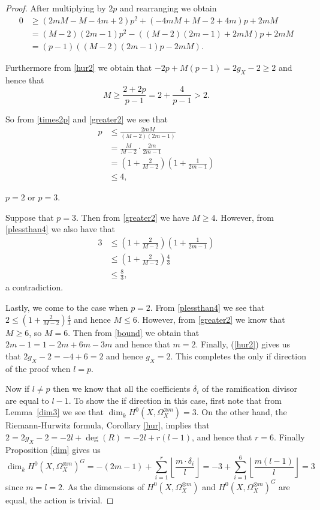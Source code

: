 \begin{proof}
After multiplying by $2p$ and rearranging we obtain
\begin{align}\label{times2p}
0 & \geq  (2mM-M-4m+2)p^2+(-4mM+M-2+4m)p+2mM \nonumber \\
& =  (M-2)(2m-1)p^2-((M-2)(2m-1)+2mM)p+2mM \nonumber \\
& =  (p-1)((M-2)(2m-1)p-2mM).
\end{align}

Furthermore from \eqref{hur2} we obtain that $-2p+M(p-1)=2g_X-2 \geq 2$ and hence that 
\begin{equation}\label{greater2}
M\geq \frac{2+2p}{p-1}=2+\frac{4}{p-1}>2.
\end{equation}

So from \eqref{times2p} and \eqref{greater2} we see that
\begin{align}\label{plessthan4}
p & \leq  \frac{2mM}{(M-2)(2m-1)}\nonumber\\
& =  \frac{M}{M-2}\cdot\frac{2m}{2m-1}\nonumber\\
& =  \left( 1+\frac{2}{M-2} \right) \left(1+\frac{1}{2m-1} \right)\\
& \leq  4, \nonumber	
\end{align}

\ie $p=2$ or $p=3$. 

Suppose that $p=3$. Then from \eqref{greater2} we have $M\geq 4$. However, from  \eqref{plessthan4} we also have that 
\begin{align*}
3 & \leq \left( 1+\frac{2}{M-2} \right) \left(1+\frac{1}{2m-1} \right)\\
& \leq  \left( 1+\frac{2}{M-2} \right) \frac{4}{3}\\
& \leq  \frac{8}{3},
\end{align*}
a contradiction.

Lastly, we come to the case when $p=2$. From \eqref{plessthan4} we see that $2\leq \left(1+\frac{2}{M-2}\right)\frac{4}{3}$ 
and hence $M\leq 6$. However, from \eqref{greater2} we know that $M\geq 6$, so $M=6$. Then from \eqref{bound}  we obtain that $2m-1=1-2m+6m-3m$
and hence that $m=2$. Finally, (\ref{hur2}) gives us that $2g_X-2=-4+6=2$ and hence $g_X=2$. 
This completes the only if direction of the proof when $l=p$.

Now if $l\neq p$ then we know that all the coefficients $\delta_i$ of the ramification divisor are equal to $l-1$. 
To show the if direction in this case, first note that from Lemma~\ref{dim3} we see that $\dim_kH^0(X,\Omega_X^{\otimes m})=3$. 
On the other hand, the Riemann-Hurwitz formula, Corollary \ref{hur}, implies that $2 = 2g_X-2=-2l+\deg(R)=-2l+r(l-1)$, and hence that $r=6$. 
Finally Proposition \ref{dim} gives us
\begin{equation*}
\dim_kH^0(X,\Omega_X^{\otimes m})^G = -(2m-1) + \sum_{i=1}^r \left\lfloor \frac{m\cdot \delta_i}{l} \right\rfloor
= -3 +\sum_{i=1}^6 \left\lfloor \frac{m(l-1)}{l} \right\rfloor
= 3
\end{equation*}
since $m=l=2$.
As the dimensions of $H^0(X,\Omega_X^{\otimes m})$ and $H^0(X,\Omega_X^{\otimes m})^G$ are equal, the action is trivial.



\end{proof}
